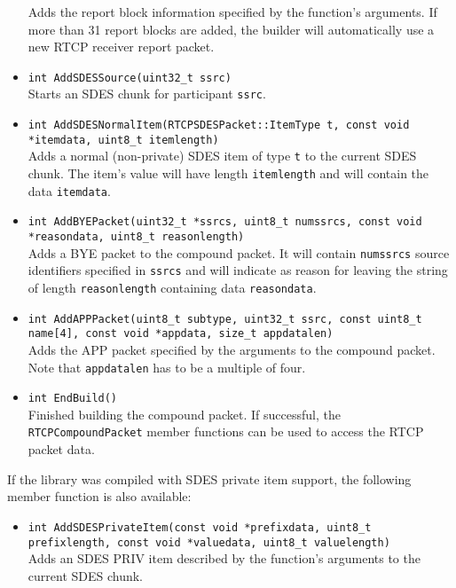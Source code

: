 \documentclass[12pt,a4paper]{article}
\begin{document}
\begin{itemize}
						Adds the report block information specified by the function's
						arguments. If more than 31 report blocks are added, the builder
						will automatically use a new RTCP receiver report packet.
					\item {\tt int AddSDESSource(uint32\_t ssrc)}\\
						Starts an SDES chunk for participant {\tt ssrc}.
					\item {\tt int AddSDESNormalItem(RTCPSDESPacket::ItemType t, const void *itemdata, uint8\_t itemlength)}\\
						Adds a normal (non-private) SDES item of type {\tt t} to the current SDES
						chunk. The item's value will have length {\tt itemlength} and will contain
						the data {\tt itemdata}.
					\item {\tt int AddBYEPacket(uint32\_t *ssrcs, uint8\_t numssrcs, const void *reasondata, uint8\_t reasonlength)}\\
						Adds a BYE packet to the compound packet. It will contain {\tt numssrcs}
						source identifiers specified in {\tt ssrcs} and will indicate
						as reason for leaving the string of length {\tt reasonlength}
						containing data {\tt reasondata}.
					\item {\tt int AddAPPPacket(uint8\_t subtype, uint32\_t ssrc, const uint8\_t name[4], const void *appdata, size\_t appdatalen)}\\
						Adds the APP packet specified by the arguments to the
						compound packet. Note that {\tt appdatalen} has to be
						a multiple of four.
					\item {\tt int EndBuild()}\\
						Finished building the compound packet. If successful, the
						{\tt RTCPCompoundPacket} member functions can be used to
						access the RTCP packet data.
				\end{itemize}

				If the library was compiled with SDES private item support, the
				following member function is also available:
				\begin{itemize}
					\item {\tt int AddSDESPrivateItem(const void *prefixdata, uint8\_t prefixlength, const void *valuedata,
	                                                  uint8\_t valuelength)}\\
						Adds an SDES PRIV item described by the function's arguments
						to the current SDES chunk.
				\end{itemize}
\end{document}
